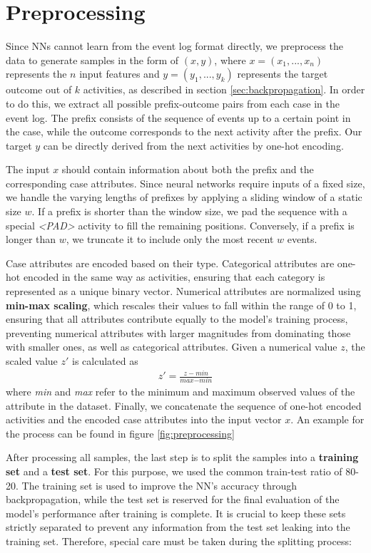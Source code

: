 \section{Preprocessing}
Since NNs cannot learn from the event log format directly,
we preprocess the data to generate samples in the form of $(x,y)$,
where $x = (x_1, ..., x_n)$ represents the $n$ input features and $y = (y_1, ..., y_k)$ represents the target outcome
out of $k$ activities, as described in section \ref{sec:backpropagation}. 
In order to do this, we extract all possible prefix-outcome pairs from each case in the event log.
The prefix consists of the sequence of events up to a certain point in the case,
while the outcome corresponds to the next activity after the prefix.
Our target $y$ can be directly derived from the next activities by one-hot encoding.

The input $x$ should contain information about both the prefix and the corresponding case attributes.
Since neural networks require inputs of a fixed size,
we handle the varying lengths of prefixes by applying a sliding window of a static size $w$.
If a prefix is shorter than the window size,
we pad the sequence with a special \textit{<PAD>} activity to fill the remaining positions.
Conversely, if a prefix is longer than $w$, we truncate it to include only the most recent $w$ events. 

Case attributes are encoded based on their type.
Categorical attributes are one-hot encoded in the same way as activities,
ensuring that each category is represented as a unique binary vector.
Numerical attributes are normalized using \textbf{min-max scaling},
which rescales their values to fall within the range of 0 to 1,
ensuring that all attributes contribute equally to the model's training process,
preventing numerical attributes with larger magnitudes from dominating those with smaller ones,
as well as categorical attributes.
Given a numerical value $z$, the scaled value $z'$ is calculated as 
\begin{align}
    z' = \frac{z - \textit{min}}{\textit{max} - \textit{min}}
\end{align}
where \textit{min} and \textit{max} refer to the minimum and maximum observed values of the attribute in the dataset.
Finally, we concatenate the sequence of one-hot encoded activities
and the encoded case attributes into the input vector $x$.
An example for the process can be found in figure \ref{fig:preprocessing}

After processing all samples, the last step is to split the samples into a \textbf{training set} and a \textbf{test set}.
For this purpose, we used the common train-test ratio of 80-20.
The training set is used to improve the NN's accuracy through backpropagation,
while the test set is reserved for the final evaluation of the model's performance after training is complete.
It is crucial to keep these sets strictly separated to prevent any information
from the test set leaking into the training set.
Therefore, special care must be taken during the splitting process: \cite{data_split}

